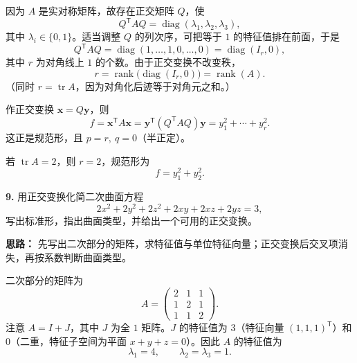 因为 \(A\) 是实对称矩阵，故存在正交矩阵 \(Q\)，使
\[
Q^{\mathsf T}AQ=\operatorname{diag}(\lambda_1,\lambda_2,\lambda_3),
\]
其中 \(\lambda_i\in\{0,1\}\)。适当调整 \(Q\) 的列次序，可把等于 \(1\) 的特征值排在前面，于是
\[
Q^{\mathsf T}AQ=\operatorname{diag}(1,\ldots,1,0,\ldots,0)
=\operatorname{diag}(I_r,0),
\]
其中 \(r\) 为对角线上 \(1\) 的个数。由于正交变换不改变秩，
\[
r=\operatorname{rank}\bigl(\operatorname{diag}(I_r,0)\bigr)=\operatorname{rank}(A).
\]
（同时 \(r=\operatorname{tr}A\)，因为对角化后迹等于对角元之和。）

作正交变换 \(\mathbf{x}=Q\mathbf{y}\)，则
\[
f=\mathbf{x}^{\mathsf T}A\mathbf{x}
=\mathbf{y}^{\mathsf T}(Q^{\mathsf T}AQ)\mathbf{y}
=y_1^2+\cdots+y_r^2.
\]
这正是规范形，且 \(p=r,\ q=0\)（半正定）。

若 \(\operatorname{tr}A=2\)，则 \(r=2\)，规范形为
\[
f=y_1^2+y_2^2.
\]

\else \answerarea[12] \fi%

\textbf{9.} 用正交变换化简二次曲面方程
\[
2x^2+2y^2+2z^2+2xy+2xz+2yz=3,
\]
写出标准形，指出曲面类型，并给出一个可用的正交变换。

\ifshowsolutions%

\textbf{思路：} 先写出二次部分的矩阵，求特征值与单位特征向量；正交变换后交叉项消失，再按系数判断曲面类型。

二次部分的矩阵为
\[
A=\begin{pmatrix}
2&1&1\\
1&2&1\\
1&1&2
\end{pmatrix}.
\]
注意 \(A=I+J\)，其中 \(J\) 为全 \(1\) 矩阵。\(J\) 的特征值为 \(3\)（特征向量 \((1,1,1)^{\mathsf T}\)）和 \(0\)（二重，特征子空间为平面 \(x+y+z=0\)）。因此 \(A\) 的特征值为
\[
\lambda_1=4,\qquad \lambda_2=\lambda_3=1.
\]

